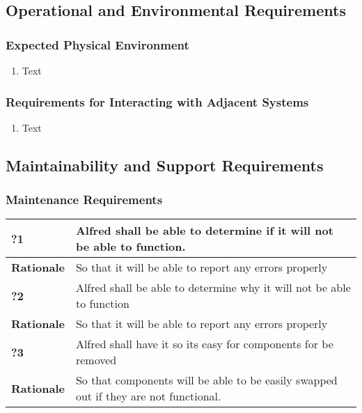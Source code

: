 \documentclass [11pt]{article}
\begin{document}
\subsection{Operational and Environmental Requirements}

\subsubsection{Expected Physical Environment }
	\begin{enumerate}[label=\textbf{(\roman*)}]
		\item Text
	\end{enumerate}

\subsubsection{Requirements for Interacting with Adjacent Systems}
	\begin{enumerate}[label=\textbf{(\roman*)}]
		\item Text
	\end{enumerate}

\subsection{Maintainability and Support Requirements }

\subsubsection{Maintenance Requirements }

\begin{longtable}{| p{ } | p{ } | }\hline 
	\rowcolor{tableCell}\textbf{?1} & Alfred shall be able to determine if it will not be able to function. \\ \hline
	\textbf{Rationale} & So that it will be able to report any errors properly\\ \hline 
	\rowcolor{tableCell}\textbf{?2} & Alfred shall be able to determine why it will not be able to function \\ \hline
	\textbf{Rationale} & So that it will be able to report any errors properly\\ \hline 
	\rowcolor{tableCell}\textbf{?3} &  Alfred shall have it so its easy for components for be removed \\ \hline
	\textbf{Rationale} & So that components will be able to be easily swapped out if they are not functional.\\ \hline 
\end{longtable}
\end{document}
